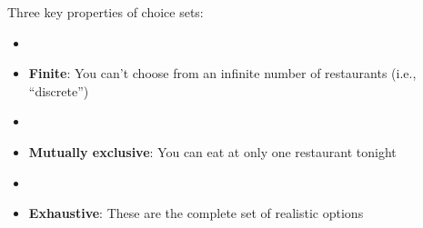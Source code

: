 \documentclass[aspectratio=169]{beamer}
\begin{document}
\begin{frame}

Three key properties of choice sets:

\begin{itemize}
\item[]
\item \textbf{Finite}: You can't choose from an infinite number of restaurants (i.e., ``discrete'')
\item[]
\item \textbf{Mutually exclusive}: You can eat at only one restaurant tonight
\item[]
\item \textbf{Exhaustive}: These are the complete set of realistic options
\end{itemize}

\end{frame}
\end{document}
